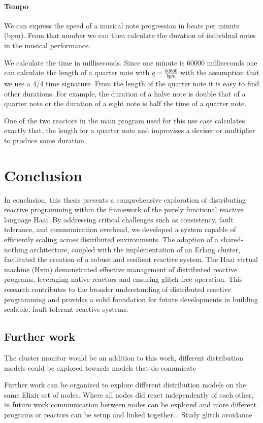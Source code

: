 \documentclass[a4paper]{book}
\begin{document}
\subsubsection*{Tempo}
We can express the speed of a musical note progression in beats per minute (bpm). From that number we can then calculate the duration of individual notes in the musical performance. 

We calculate the time in milliseconds. Since one minute is 60000 milliseconds one can calculate the length of a quarter note with \(q = \frac{60000}{bpm}\) with the assumption that we use a 4/4 time signature. From the length of the quarter note it is easy to find other durations. For example, the duration of a halve note is double that of a quarter note or the duration of a eight note is half the time of a quarter note.

One of the two reactors in the main program used for this use case calculates exactly that, the length for a quarter note and improvises a deviser or multiplier to produce some duration. 

\chapter{Conclusion}
In conclusion, this thesis presents a comprehensive exploration of distributing reactive programming within the framework of the purely functional reactive language Haai. By addressing critical challenges such as consistency, fault tolerance, and communication overhead, we developed a system capable of efficiently scaling across distributed environments. The adoption of a shared-nothing architecture, coupled with the implementation of an Erlang cluster, facilitated the creation of a robust and resilient reactive system. The Haai virtual machine (Hvm) demonstrated effective management of distributed reactive programs, leveraging native reactors and ensuring glitch-free operation. This research contributes to the broader understanding of distributed reactive programming and provides a solid foundation for future developments in building scalable, fault-tolerant reactive systems.


\section{Further work}
The cluster monitor would be an addition to this work, different distribution models could be explored towards models that do comunicate 

Further work can be organized to explore different distribution models on the same Elixir set of nodes. Where all nodes did react independently of each other, in future work communication between nodes can be explored and more different programs or reactors can be setup and linked together...
Study glitch avoidance 

\printbibliography
\end{document}
